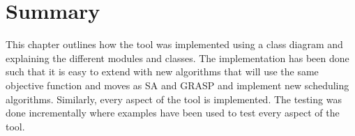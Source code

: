 \section{Summary}
This chapter outlines how the tool was implemented using a class diagram and explaining the different modules and classes. The implementation has been done such that it is easy to extend with new algorithms that will use the same objective function and moves as SA and GRASP and implement new scheduling algorithms. Similarly, every aspect of the tool is implemented. The testing was done incrementally where examples have been used to test every aspect of the tool.